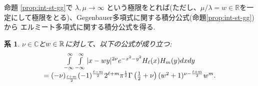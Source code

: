 \documentclass[pdf,notes]{beamer}
\newtheorem{cor}{系}
\begin{document}
\begin{frame}
	命題 \ref{prop:int-st-gg}で $\lambda,\mu\to\infty$ 
	という極限をとれば(ただし、$\mu/\lambda=w\in\mathbb{R}$を一定にして極限をとる)、Gegenbauer多項式に関する積分公式(命題\ref{prop:int-st-gg})から
	エルミート多項式に関する積分公式を得る.
	\begin{cor}\label{cor:int-xzy-hh}
		$\nu\in\mathbb{C}$と$w\in\mathbb{R}$に対して、以下の公式が成り立つ:
		\begin{equation*}
			\begin{array}[]{c}
			\int_{- \infty}^{\infty} \int_{- \infty}^{\infty} | x - w y |^{2 \nu} e^{-
			x^2 - y^2} H_\ell (x) H_m (y) d x d y \\= (- \nu)_{\frac{\ell + m}{2}} (- 1)^{\frac{\ell
			- m}{2}} 2^{\ell + m} \pi^{\frac{1}{2}} \Gamma \left( \frac{1}{2} + \nu \right)
			(w^2 + 1)^{\nu - \frac{\ell + m}{2}} w^m .
			\end{array}
		\end{equation*}
	\end{cor}
\end{frame}
\end{document}
